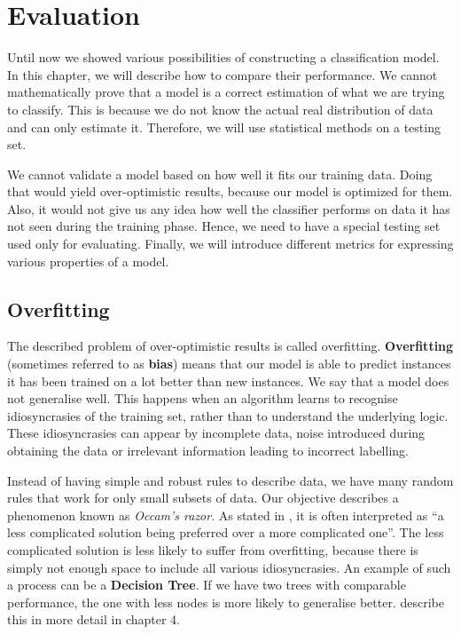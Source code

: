\chapter{Evaluation} \label{chap:eval}

Until now we showed various possibilities of constructing a classification model.
In this chapter, we will describe how to compare their performance.
We cannot mathematically prove that a model is a correct estimation of what we are trying to classify.
This is because we do not know the actual real distribution of data and can only estimate it.
Therefore, we will use statistical methods on a testing set.

We cannot validate a model based on how well it fits our training data.
Doing that would yield over-optimistic results, because our model is optimized for them.
Also, it would not give us any idea how well the classifier performs on data it has not seen during the training phase.
Hence, we need to have a special testing set used only for evaluating.
Finally, we will introduce different metrics for expressing various properties of a model.

\section{Overfitting}

The described problem of over-optimistic results is called overfitting.
{\bf Overfitting} (sometimes referred to as {\bf bias}) means
that our model is able to predict instances it has been trained on a lot better than new instances. 
We say that a model does not generalise well.
This happens when an algorithm learns to recognise idiosyncrasies of the training set,
rather than to understand the underlying logic.
These idiosyncrasies can appear by incomplete data, noise introduced during obtaining the data or
irrelevant information leading to incorrect labelling.

Instead of having simple and robust rules to describe data,
we have many random rules that work for only small subsets of data.
Our objective describes a phenomenon known as {\it Occam's razor}.
As stated in \citet{sammut2011encyclopedia}, it is often interpreted as
``a less complicated solution being preferred over a more complicated one''.
The less complicated solution is less likely to suffer from overfitting,
because there is simply not enough space to include all various idiosyncrasies.
An example of such a process can be a {\bf Decision Tree}.
If we have two trees with comparable performance,
the one with less nodes is more likely to generalise better.
\citet{TanBachKum08} describe this in more detail in chapter 4.


